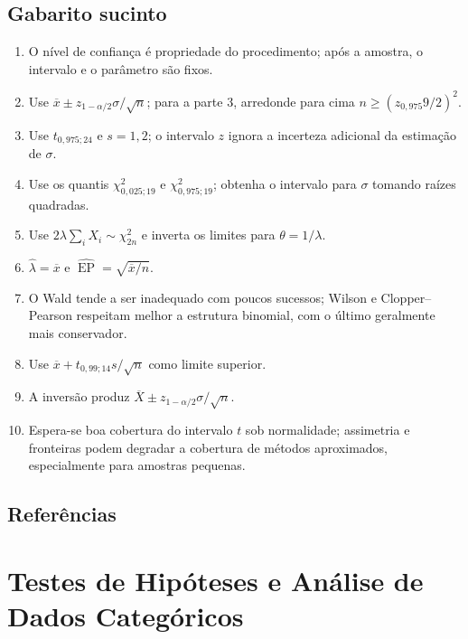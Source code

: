 \documentclass[
  letterpaper,
  DIV=11,
  numbers=noendperiod]{scrreprt}
\providecommand{\tightlist}{%
  \setlength{\itemsep}{0pt}\setlength{\parskip}{0pt}}\usepackage{longtable,booktabs,array}
\begin{document}
\section{Gabarito sucinto}\label{gabarito-sucinto}

\begin{enumerate}
\def\labelenumi{\arabic{enumi}.}
\tightlist
\item
  O nível de confiança é propriedade do procedimento; após a amostra, o
  intervalo e o parâmetro são fixos.
\item
  Use \(\overline x\pm z_{1-\alpha/2}\sigma/\sqrt n\); para a parte 3,
  arredonde para cima \(n\geq(z_{0{,}975}9/2)^2\).
\item
  Use \(t_{0{,}975;24}\) e \(s=1{,}2\); o intervalo \(z\) ignora a
  incerteza adicional da estimação de \(\sigma\).
\item
  Use os quantis \(\chi^2_{0{,}025;19}\) e \(\chi^2_{0{,}975;19}\);
  obtenha o intervalo para \(\sigma\) tomando raízes quadradas.
\item
  Use \(2\lambda\sum_iX_i\sim\chi^2_{2n}\) e inverta os limites para
  \(\theta=1/\lambda\).
\item
  \(\widehat\lambda=\overline x\) e
  \(\widehat{\operatorname{EP}}=\sqrt{\overline x/n}\).
\item
  O Wald tende a ser inadequado com poucos sucessos; Wilson e
  Clopper--Pearson respeitam melhor a estrutura binomial, com o último
  geralmente mais conservador.
\item
  Use \(\overline x+t_{0{,}99;14}s/\sqrt n\) como limite superior.
\item
  A inversão produz \(\overline X\pm z_{1-\alpha/2}\sigma/\sqrt n\).
\item
  Espera-se boa cobertura do intervalo \(t\) sob normalidade; assimetria
  e fronteiras podem degradar a cobertura de métodos aproximados,
  especialmente para amostras pequenas.
\end{enumerate}

\section*{Referências}\label{referuxeancias-4}



\chapter{Testes de Hipóteses e Análise de Dados
Categóricos}\label{testes-de-hipuxf3teses-e-anuxe1lise-de-dados-categuxf3ricos}
\end{document}
